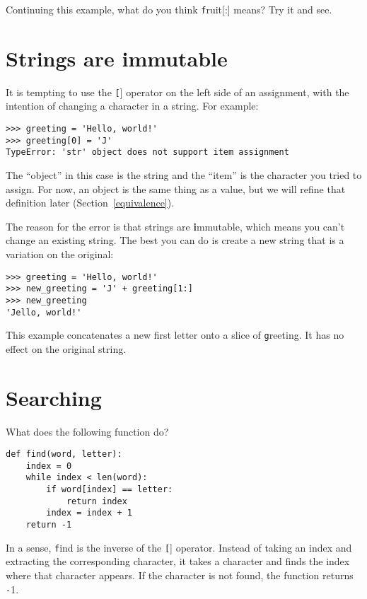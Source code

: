 \documentclass[
DIV=11,
fontsize=13,
twoside,
headinclude=false,
titlepage=firstiscover,
abstract=true,
headsepline=true,
footsepline=true,
chapterprefix=true, %
headings=big,
bibliography=totoc,%
captions=tableheading
]{scrbook}
\theoremstyle{definition}
\begin{document}
Continuing this example, what do you think 
{\texttt fruit[:]} means?  Try it and see.



\section{Strings are immutable}

It is tempting to use the {\texttt []} operator on the left side of an
assignment, with the intention of changing a character in a string.
For example:

\begin{lstlisting}
>>> greeting = 'Hello, world!'
>>> greeting[0] = 'J'
TypeError: 'str' object does not support item assignment
\end{lstlisting}
%
The ``object'' in this case is the string and the ``item'' is
the character you tried to assign.  For now, an object is
the same thing as a value, but we will refine that definition
later (Section~\ref{equivalence}).  

The reason for the error is that
strings are {\textbf immutable}, which means you can't change an
existing string.  The best you can do is create a new string
that is a variation on the original:

\begin{lstlisting}
>>> greeting = 'Hello, world!'
>>> new_greeting = 'J' + greeting[1:]
>>> new_greeting
'Jello, world!'
\end{lstlisting}
%
This example concatenates a new first letter onto
a slice of {\texttt greeting}.  It has no effect on
the original string.


\section{Searching}
\label{find}

What does the following function do?

\begin{lstlisting}
def find(word, letter):
    index = 0
    while index < len(word):
        if word[index] == letter:
            return index
        index = index + 1
    return -1
\end{lstlisting}
%
In a sense, {\texttt find} is the inverse of the {\texttt []} operator.
Instead of taking an index and extracting the corresponding character,
it takes a character and finds the index where that character
appears.  If the character is not found, the function returns {\texttt
-1}.
\end{document}
